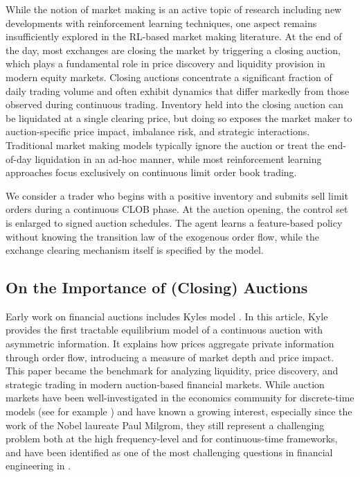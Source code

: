 \documentclass[11pt]{article}
\begin{document}
While the notion of market making is an active topic of research including new developments with reinforcement learning techniques, one aspect remains insufficiently explored in the RL-based market making literature. At the end of the day, most exchanges are closing the market by triggering a closing auction, which plays a fundamental role in price discovery and liquidity provision in modern equity markets. Closing auctions concentrate a significant fraction of daily trading volume and often exhibit dynamics that differ markedly from those observed during continuous trading. Inventory held into the closing auction can be liquidated at a single clearing price, but doing so exposes the market maker to auction-specific price impact, imbalance risk, and strategic interactions. Traditional market making models typically ignore the auction or treat the end-of-day liquidation in an ad-hoc manner, while most reinforcement learning approaches focus exclusively on continuous limit order book trading.\vspace{0.5em}

We consider a trader who begins with a positive inventory and submits sell limit orders during a continuous CLOB phase. At the auction opening, the control set is enlarged to signed auction schedules. The agent learns a feature-based policy without knowing the transition law of the exogenous order flow, while the exchange clearing mechanism itself is specified by the model.

\subsection{On the Importance of (Closing) Auctions}

Early work on financial auctions includes Kyle\textquotesingle s model \cite{kyle1985continuous}. In this article, Kyle provides the first tractable equilibrium model of a continuous auction with asymmetric information. It explains how prices aggregate private information through order flow, introducing a measure of market depth and price impact. This paper became the benchmark for analyzing liquidity, price discovery, and strategic trading in modern auction-based financial markets. While auction markets have been well-investigated in the economics community for discrete-time models (see for example \cite{milgrom1989auctions,vulcano2002optimal,milgrom2004putting}) and have known a growing interest, especially since the work of the Nobel laureate Paul Milgrom, they still represent a challenging problem both at the high frequency-level and for continuous-time frameworks, and have been identified as one of the most challenging questions in financial engineering in \cite[Section 5.1]{carmona2022influence}. \vspace{0.5em}
\end{document}
